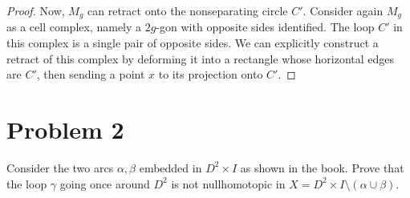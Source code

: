 \documentclass[fontsize=11pt]{scrartcl} %
\numberwithin{equation}{section} %
\numberwithin{figure}{section} %
\numberwithin{table}{section} %
\begin{document}
\begin{proof}
    Now, $M_g$ can retract onto the nonseparating circle $C'$. Consider again
    $M_g$ as a cell complex, namely a $2g$-gon with opposite sides identified.
    The loop $C'$ in this complex is a single pair of opposite sides. We can
    explicitly construct a retract of this complex by deforming it into a
    rectangle whose horizontal edges are $C'$, then sending a point $x$ to its
    projection onto $C'$.
\end{proof}

\section*{Problem 2}
Consider the two arcs $\alpha,\beta$ embedded in $D^2\times I$ as shown in the
book. Prove that the loop $\gamma$ going once around $D^2$ is not nullhomotopic
in $X = D^2\times I\setminus(\alpha\cup\beta)$.
\\
\\
\end{document}

